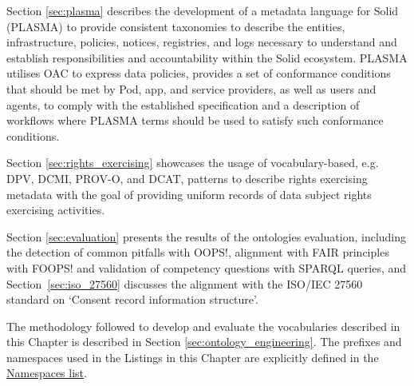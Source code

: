 Section \ref{sec:plasma} describes the development of a metadata language for Solid (PLASMA) to provide consistent taxonomies to describe the entities, infrastructure, policies, notices, registries, and logs necessary to understand and establish responsibilities and accountability within the Solid ecosystem.
PLASMA utilises OAC to express data policies, provides a set of conformance conditions that should be met by Pod, app, and service providers, as well as users and agents, to comply with the established specification and a description of workflows where PLASMA terms should be used to satisfy such conformance conditions.

Section \ref{sec:rights_exercising} showcases the usage of vocabulary-based, e.g. DPV, DCMI, PROV-O, and DCAT, patterns to describe rights exercising metadata with the goal of providing uniform records of data subject rights exercising activities.

Section \ref{sec:evaluation} presents the results of the ontologies evaluation, including the detection of common pitfalls with OOPS!, alignment with FAIR principles with FOOPS! and validation of competency questions with SPARQL queries, and Section~\ref{sec:iso_27560} discusses the alignment with the ISO/IEC 27560 standard on `Consent record information structure'.

The methodology followed to develop and evaluate the vocabularies described in this Chapter is described in Section \ref{sec:ontology_engineering}.
The prefixes and namespaces used in the Listings in this Chapter are explicitly defined in the \hyperref[sec:namespaces]{Namespaces list}.







